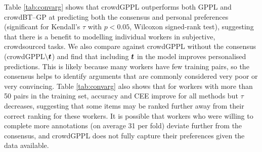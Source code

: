 Table \ref{tab:convarg} shows that 
crowdGPPL outperforms both GPPL and
crowdBT--GP 
at predicting both the consensus and personal preferences
(significant for Kendall's $\tau$ with $p<0.05$, Wilcoxon signed-rank test),
suggesting that there is a benefit
to modelling individual workers in subjective, crowdsourced tasks. 
We also compare against crowdGPPL without the consensus (crowdGPPL$\backslash \boldsymbol t$)
and find that including $\boldsymbol t$ in the model improves personalised
predictions. This is likely because many workers have few training pairs, 
so the consensus helps to identify arguments that are commonly considered very poor or very
convincing.
Table \ref{tab:convarg} also shows that for
workers with more than 50 pairs in the training set,
accuracy and CEE improve for all methods but
$\tau$ decreases,
suggesting that some items may be ranked further away from their correct ranking 
for these workers. It is possible that workers who were willing to complete more
annotations (on average 31 per fold)
deviate further from the consensus, and crowdGPPL does not fully capture
their preferences given the data available.

